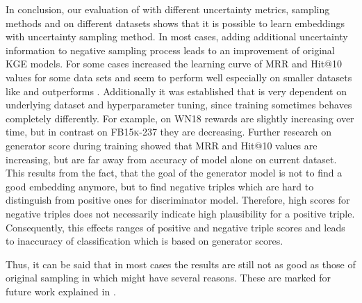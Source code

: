 In conclusion, our evaluation of \usgan with different uncertainty metrics, sampling methods and on different datasets shows that it is possible to learn embeddings with uncertainty sampling method.
In most cases, adding additional uncertainty information to negative sampling process leads to an improvement of original \ac{KGE} models.
For some cases \usgan increased the learning curve of MRR and Hit@10 values for some data sets and seem to perform well especially on smaller datasets like \umls and outperforms \kbgan.
Additionally it was established that \usgan is very dependent on underlying dataset and hyperparameter tuning, since training sometimes behaves completely differently.
For example, on \textsc{WN18} rewards are slightly increasing over time, but in contrast on \textsc{FB15k-237} they are decreasing.
Further research on generator score during training showed that MRR and Hit@10 values are increasing, but are far away from accuracy of model alone on current dataset.
This results from the fact, that the goal of the generator model is not to find a good embedding anymore, but to find negative triples which are hard to distinguish from positive ones for discriminator model.
Therefore, high scores for negative triples does not necessarily indicate high plausibility for a positive triple.
Consequently, this effects ranges of positive and negative triple scores and leads to inaccuracy of classification which is based on generator scores.

Thus, it can be said that in most cases the results are still not as good as those of original sampling in \kbgan which might have several reasons.
These are marked for future work explained in .





